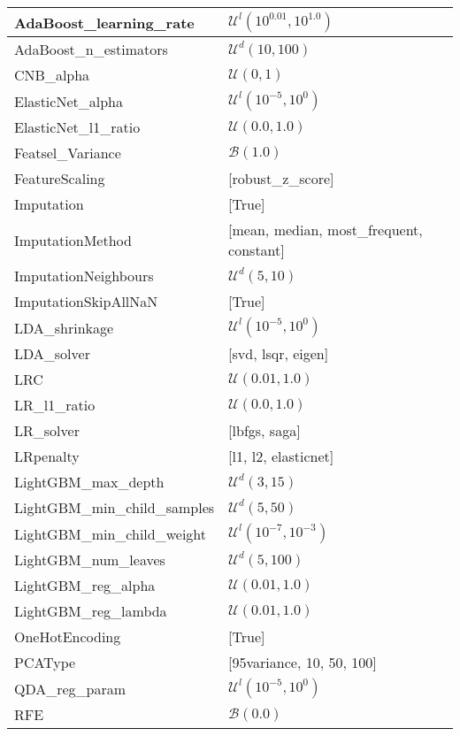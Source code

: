 \begin{table}[]
\begin{tabular}{l|l}
AdaBoost\_learning\_rate & $\mathcal{U}^l(10^{0.01}, 10^{1.0})$ \\ \hline
AdaBoost\_n\_estimators & $\mathcal{U}^d(10, 100)$ \\ \hline
CNB\_alpha & $\mathcal{U}(0, 1)$ \\ \hline
ElasticNet\_alpha & $\mathcal{U}^l(10^{-5}, 10^{0})$ \\ \hline
ElasticNet\_l1\_ratio & $\mathcal{U}(0.0, 1.0)$ \\ \hline
Featsel\_Variance & $\mathcal{B}(1.0)$ \\ \hline
FeatureScaling & {[robust\_z\_score]} \\ \hline
Imputation & {[True]} \\ \hline
ImputationMethod & {[mean, median, most\_frequent, constant]} \\ \hline
ImputationNeighbours & $\mathcal{U}^d(5, 10)$ \\ \hline
ImputationSkipAllNaN & {[True]} \\ \hline
LDA\_shrinkage & $\mathcal{U}^l(10^{-5}, 10^{0})$ \\ \hline
LDA\_solver & {[svd, lsqr, eigen]} \\ \hline
LRC & $\mathcal{U}(0.01, 1.0)$ \\ \hline
LR\_l1\_ratio & $\mathcal{U}(0.0, 1.0)$ \\ \hline
LR\_solver & {[lbfgs, saga]} \\ \hline
LRpenalty & {[l1, l2, elasticnet]} \\ \hline
LightGBM\_max\_depth & $\mathcal{U}^d(3, 15)$ \\ \hline
LightGBM\_min\_child\_samples & $\mathcal{U}^d(5, 50)$ \\ \hline
LightGBM\_min\_child\_weight & $\mathcal{U}^l(10^{-7}, 10^{-3})$ \\ \hline
LightGBM\_num\_leaves & $\mathcal{U}^d(5, 100)$ \\ \hline
LightGBM\_reg\_alpha & $\mathcal{U}(0.01, 1.0)$ \\ \hline
LightGBM\_reg\_lambda & $\mathcal{U}(0.01, 1.0)$ \\ \hline
OneHotEncoding & {[True]} \\ \hline
PCAType & {[95variance, 10, 50, 100]} \\ \hline
QDA\_reg\_param & $\mathcal{U}^l(10^{-5}, 10^{0})$ \\ \hline
RFE & $\mathcal{B}(0.0)$ \\ \hline

\end{tabular}
\end{table}
